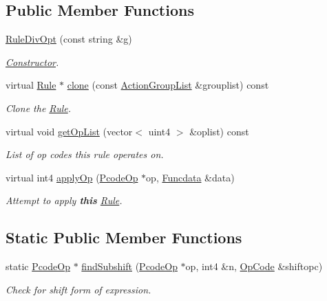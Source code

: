 \subsection*{Public Member Functions}
\begin{DoxyCompactItemize}
\item 
\mbox{\hyperlink{class_rule_div_opt_a13ab29d84fa1b5155760bd55ef5d5ad6}{Rule\+Div\+Opt}} (const string \&g)
\begin{DoxyCompactList}\small\item\em \mbox{\hyperlink{class_constructor}{Constructor}}. \end{DoxyCompactList}\item 
virtual \mbox{\hyperlink{class_rule}{Rule}} $\ast$ \mbox{\hyperlink{class_rule_div_opt_a4fb0c5c3f7dec93f20d65f1919693802}{clone}} (const \mbox{\hyperlink{class_action_group_list}{Action\+Group\+List}} \&grouplist) const
\begin{DoxyCompactList}\small\item\em Clone the \mbox{\hyperlink{class_rule}{Rule}}. \end{DoxyCompactList}\item 
virtual void \mbox{\hyperlink{class_rule_div_opt_adff3658edfa28c90464397a2e7c5b739}{get\+Op\+List}} (vector$<$ uint4 $>$ \&oplist) const
\begin{DoxyCompactList}\small\item\em List of op codes this rule operates on. \end{DoxyCompactList}\item 
virtual int4 \mbox{\hyperlink{class_rule_div_opt_a8443133b32d917f3b751ba1fa7dee8f1}{apply\+Op}} (\mbox{\hyperlink{class_pcode_op}{Pcode\+Op}} $\ast$op, \mbox{\hyperlink{class_funcdata}{Funcdata}} \&data)
\begin{DoxyCompactList}\small\item\em Attempt to apply {\bfseries{this}} \mbox{\hyperlink{class_rule}{Rule}}. \end{DoxyCompactList}\end{DoxyCompactItemize}
\subsection*{Static Public Member Functions}
\begin{DoxyCompactItemize}
\item 
static \mbox{\hyperlink{class_pcode_op}{Pcode\+Op}} $\ast$ \mbox{\hyperlink{class_rule_div_opt_abcf7a06a2ba2e6e745b33499d4c55751}{find\+Subshift}} (\mbox{\hyperlink{class_pcode_op}{Pcode\+Op}} $\ast$op, int4 \&n, \mbox{\hyperlink{opcodes_8hh_abeb7dfb0e9e2b3114e240a405d046ea7}{Op\+Code}} \&shiftopc)
\begin{DoxyCompactList}\small\item\em Check for shift form of expression. \end{DoxyCompactList}\end{DoxyCompactItemize}

